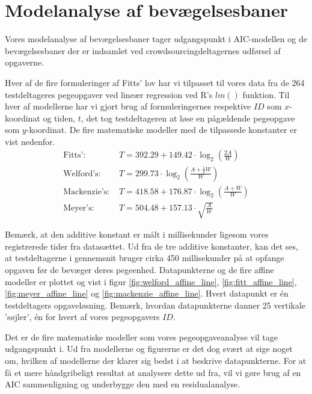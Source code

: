 \section*{Modelanalyse af bevægelsesbaner}
Vores modelanalyse af bevægelsesbaner tager udgangspunkt i AIC-modellen og de bevægelsesbaner der er indsamlet ved crowdsourcingdeltagernes udførsel af opgaverne.

Hver af de fire formuleringer af Fitts' lov har vi tilpasset til vores data fra de 264 testdeltageres pegeopgaver ved lineær regression ved R's $lm()$ funktion. Til hver af modellerne har vi gjort brug af formuleringernes respektive $ID$ som $x$-koordinat og tiden, $t$, det tog testdeltageren at løse en pågældende pegeopgave som $y$-koordinat. De fire matematiske modeller med de tilpassede konstanter er vist nedenfor.
\begin{align*}
\text{Fitts': } &T = 392.29 + 149.42\cdot \log_2\left(\frac{2A}{W}\right)\\
\text{Welford's: } &T =  299.73\cdot \log_2\left(\frac{A+\frac{1}{2}W}{W}\right)\\
\text{Mackenzie's: } &T = 418.58 + 176.87\cdot \log_2\left(\frac{A+W}{W}\right)\\
\text{Meyer's: } &T = 504.48 + 157.13 \cdot \sqrt{\frac{A}{W}}
\end{align*}

Bemærk, at den additive konstant er målt i millisekunder ligesom vores registrerede tider fra datasættet. Ud fra de tre additive konstanter, kan det ses, at testdeltagerne i gennemsnit bruger cirka 450 millisekunder på at opfange opgaven før de bevæger deres pegeenhed. Datapunkterne og de fire affine modeller er plottet og vist i figur \ref{fig:welford_affine_line}, \ref{fig:fitt_affine_line}, \ref{fig:meyer_affine_line} og \ref{fig:mackenzie_affine_line}. Hvert datapunkt er én testdeltagers opgaveløsning. Bemærk, hvordan datapunkterne danner 25 vertikale 'søjler', én for hvert af vores pegeopgavers $ID$.

Det er de fire matematiske modeller som vores pegeopgaveanalyse vil tage udgangspunkt i. Ud fra modellerne og figurerne er det dog svært at sige noget om, hvilken af modellerne der klarer sig bedst i at beskrive datapunkterne. For at få et mere håndgribeligt resultat at analysere dette ud fra, vil vi gøre brug af en AIC sammenligning og underbygge den med en residualanalyse.


